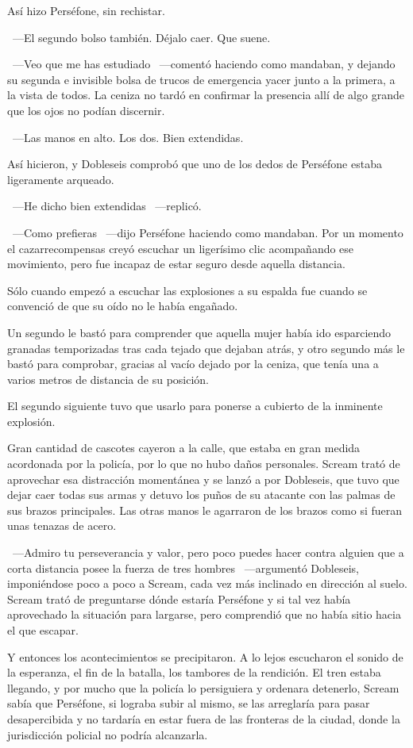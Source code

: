 Así hizo Perséfone, sin rechistar.

~---El segundo bolso también. Déjalo caer. Que suene.

~---Veo que me has estudiado ~---comentó haciendo como  mandaban, y dejando su segunda e invisible bolsa de trucos de emergencia yacer junto a la primera, a la vista de todos. La ceniza no tardó en confirmar la presencia allí de algo grande que los ojos no podían discernir.

~---Las manos en alto. Los dos. Bien extendidas.

Así hicieron, y Dobleseis comprobó que uno de los dedos de Perséfone estaba ligeramente arqueado.

~---He dicho bien extendidas ~---replicó.

~---Como prefieras ~---dijo Perséfone haciendo como  mandaban. Por un momento el cazarrecompensas creyó escuchar un ligerísimo clic acompañando ese movimiento, pero fue incapaz de estar seguro desde aquella distancia.

Sólo cuando empezó a escuchar las explosiones a su espalda fue cuando se convenció de que su oído no le había engañado.

Un segundo le bastó para comprender que aquella mujer había ido esparciendo granadas temporizadas tras cada tejado que dejaban atrás, y otro segundo más le bastó para comprobar, gracias al vacío dejado por la ceniza, que tenía una a varios metros de distancia de su posición.

El segundo siguiente tuvo que usarlo para ponerse a cubierto de la inminente explosión.

Gran cantidad de cascotes cayeron a la calle, que estaba en gran medida acordonada por la policía, por lo que no hubo daños personales. Scream trató de aprovechar esa distracción momentánea y se lanzó a por Dobleseis, que tuvo que dejar caer todas sus armas y detuvo los puños de su atacante con las palmas de sus brazos principales. Las otras manos le agarraron de los brazos como si fueran unas tenazas de acero.

~---Admiro tu perseverancia y valor, pero poco puedes hacer contra alguien que a corta distancia posee la fuerza de tres hombres ~---argumentó Dobleseis, imponiéndose poco a poco a Scream, cada vez más inclinado en dirección al suelo. Scream trató de preguntarse dónde estaría Perséfone y si tal vez había aprovechado la situación para largarse, pero comprendió que no había sitio hacia el que escapar.

Y entonces los acontecimientos se precipitaron. A lo lejos escucharon el sonido de la esperanza, el fin de la batalla, los tambores de la rendición. El tren estaba llegando, y por mucho que la policía lo persiguiera y ordenara detenerlo, Scream sabía que Perséfone, si lograba subir al mismo, se las arreglaría para pasar desapercibida y no tardaría en estar fuera de las fronteras de la ciudad, donde la jurisdicción policial no podría alcanzarla.

